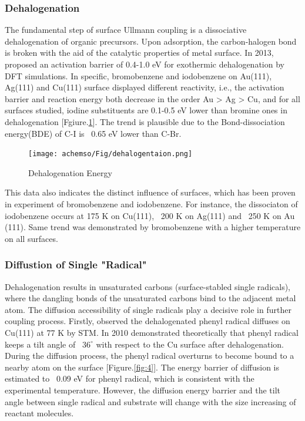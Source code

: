 \documentclass[journal=jacsat,manuscript=article]{achemso}
\begin{document}
\subsubsection{Dehalogenation}

The fundamental step of surface Ullmann coupling is a dissociative dehalogenation of organic precursors. Upon adsorption, the carbon-halogen bond is broken with the aid of the catalytic properties of metal surface. In 2013, \citeauthor{jacs2013}\cite{jacs2013} proposed an activation barrier of 0.4-1.0 eV for exothermic dehalogenation by DFT simulations. In specific, bromobenzene and iodobenzene on Au(111), Ag(111) and Cu(111) surface displayed different reactivity, i.e., the activation barrier and reaction energy both decrease in the order Au > Ag > Cu, and for all surfaces studied, iodine substituents are 0.1-0.5 eV lower than bromine ones in dehalogenation [Fgiure.\ref{fig:dehalo}]. The trend is plausible due to the Bond-dissociation energy(BDE) of C-I is ~0.65 eV lower than C-Br\cite{Arpc1982}.

\begin{figure}[ht]
\centering
\texttt{[image: achemso/Fig/dehalogentaion.png]}
\caption{Dehalogenation Energy}
\label{fig:dehalo}
\end{figure}
This data also indicates the distinct influence of surfaces, which has been proven in experiment of bromobenzene and iodobenzene. For instance, the dissociaton of iodobenzene occurs at 175 K on Cu(111)\cite{sur_sci01}, ~200 K on Ag(111)\cite{sur_sci02} and ~250 K on Au (111)\cite{sur_sci03}. Same trend was demonstrated by bromobenzene with a higher temperature on all surfaces.


\subsubsection{Diffustion of Single "Radical"}
Dehalogenation results in unsaturated carbons (surface-stabled single radicals), where the dangling bonds of the unsaturated carbons bind to the adjacent metal atom. The diffusion accessibility of single radicals play a decisive role in further coupling process. Firstly, \citeauthor{langm01}\cite{langm01} observed the dehalogenated phenyl radical diffuses on Cu(111) at 77 K by STM. In 2010 \citeauthor{pccp2010}\cite{pccp2010} demonstrated theoretically that phenyl radical keeps a tilt angle of ~$36^\circ$ with respect to the Cu surface after dehalogenation. During the diffusion process, the phenyl radical overturns to become bound to a nearby atom on the surface [Figure.\ref{fig:4}]. The energy barrier of diffusion is estimated to ~0.09 eV for phenyl radical, which is consistent with the experimental temperature. However, the diffusion energy barrier and the tilt angle between single radical and substrate will change with the size increasing of reactant molecules.
\end{document}

